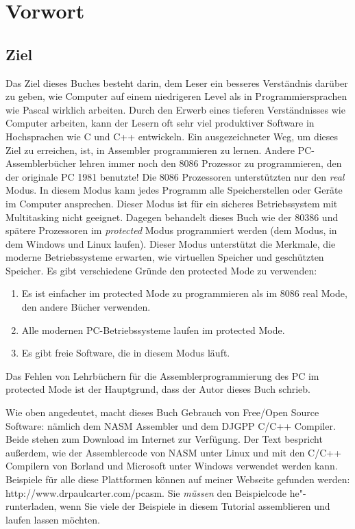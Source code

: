 
\chapter{Vorwort}

\section*{Ziel}

Das Ziel dieses Buches besteht darin, dem Leser ein besseres
Verst\"{a}ndnis dar\"{u}ber zu geben, wie Computer auf einem niedrigeren
Level als in Programmiersprachen wie Pascal wirklich arbeiten. Durch
den Erwerb eines tieferen Verst\"{a}ndnisses wie Computer arbeiten, kann
der Lesern oft sehr viel produktiver Software in Hochsprachen wie C
und C++ entwickeln. Ein ausgezeichneter Weg, um dieses Ziel zu
erreichen, ist, in Assembler programmieren zu lernen. Andere
PC-Assemblerb\"{u}cher lehren immer noch den 8086 Prozessor zu
programmieren, den der originale PC 1981 benutzte! Die 8086
Prozessoren unterst\"{u}tzten nur den \emph{real} Modus. In diesem Modus
kann jedes Programm alle Speicherstellen oder Ger\"{a}te im Computer
ansprechen. Dieser Modus ist f\"{u}r ein sicheres Betriebssystem mit
Multitasking nicht geeignet. Dagegen behandelt dieses Buch wie der
80386 und sp\"{a}tere Prozessoren im \emph{protected} Modus programmiert
werden (dem Modus, in dem Windows und Linux laufen). Dieser Modus
unterst\"{u}tzt die Merkmale, die moderne Betriebssysteme erwarten, wie
virtuellen Speicher und gesch\"{u}tzten Speicher. Es gibt verschiedene
Gr\"{u}nde den protected Mode zu verwenden:
\begin{enumerate}
\parskip=-0.50em %
\item Es ist einfacher im protected Mode zu programmieren als im 8086
real Mode, den andere B\"{u}cher verwenden.
\item Alle modernen PC-Betriebssysteme laufen im protected Mode.
\item Es gibt freie Software, die in diesem Modus l\"{a}uft.
\end{enumerate}
Das Fehlen von Lehrb\"{u}chern f\"{u}r die Assemblerprogrammierung des PC im
protected Mode ist der Hauptgrund, dass der Autor dieses Buch
schrieb.

Wie oben angedeutet, macht dieses Buch Gebrauch von Free/Open Source
Software: n\"{a}mlich dem NASM Assembler und dem DJGPP C/C++ Compiler.
Beide stehen zum Download im Internet zur Verf\"{u}gung. Der Text
bespricht au{\ss}erdem, wie der Assemblercode von NASM unter Linux und
mit den C/C++ Compilern von Borland und Microsoft unter Windows
verwendet werden kann. Beispiele f\"{u}r alle diese Plattformen k\"{o}nnen
auf meiner Webseite gefunden werden: {\code
http://www.drpaulcarter.com/pcasm}. Sie \emph{m\"{u}ssen} den
Beispielcode he"-runterladen, wenn Sie viele der Beispiele in diesem
Tutorial assemblieren und laufen lassen m\"{o}chten.

